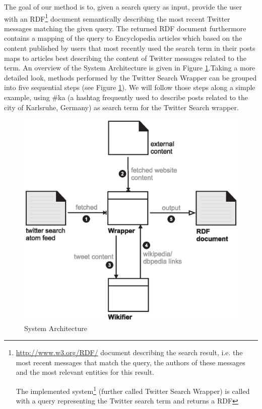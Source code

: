 \documentclass{llncs}
\begin{document}
The goal of our method is to, given a search query as input, provide the user with an RDF\footnote{\url{http://www.w3.org/RDF/} document describing the search result, i.e. the most recent messages that match the query, the authors of these messages and the most relevant entities for this result.



The implemented system\footnote{\url{http://km.aifb.kit.edu/services/twittersearchwrap/}} (further called Twitter Search Wrapper) is called with a query representing
the Twitter search term and returns a RDF}
document semantically describing the most recent Twitter messages matching the
given query. The returned RDF document furthermore contains a mapping of the
query to Encyclopedia articles which based on the content published by users that most recently used the search
term in their posts maps to articles best describing the content of Twitter
messages related to the term. An overview of the System Architecture is given in Figure
\ref{fig:arch}.\newline Taking a more detailed look, methods performed by the
Twitter Search Wrapper can be grouped into five sequential steps (see Figure
\ref{fig:arch}). We will follow those steps along a simple example, using
\#ka (a hashtag frequently used to describe posts related to the city of
Karlsruhe, Germany) as search term for the Twitter Search wrapper.

\begin{figure}[htb]
  \centering
  \includegraphics[width=.6\linewidth]{architecture}
  \caption{System Architecture}
  \label{fig:arch}
\end{figure}
\end{document}
